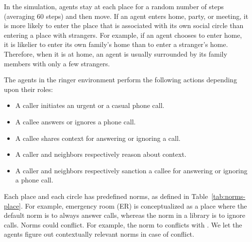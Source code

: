 In the simulation, agents stay at each place for a random number of steps (averaging 60 steps) and then move. If an agent enters home, party, or meeting, it is more likely to enter the place that is associated with its own social circle than entering a place with strangers. For example, if an agent chooses to enter home, it is likelier to enter its own family's home than to enter a stranger's home. Therefore, when it is at home, an agent is usually surrounded by its family members with only a few strangers. 

The agents in the ringer environment perform the following actions depending upon their roles:
\begin{itemize}
\item A caller initiates an urgent or a casual phone call.
\item A callee answers or ignores a phone call.
\item A callee shares context for answering or ignoring a call.
\item A caller and neighbors respectively reason about context.
\item A caller and neighbors respectively sanction a callee for answering or ignoring a phone call.
\end{itemize}

Each place and each circle has predefined norms, as defined in Table~\ref{tab:norms-place}. For example, emergency room (ER) is conceptualized as a place where the default norm is to always answer calls, whereas the norm in a library is to ignore calls. Norms could conflict. For example, the norm to  conflicts with . We let the agents figure out contextually relevant norms in case of conflict. 

